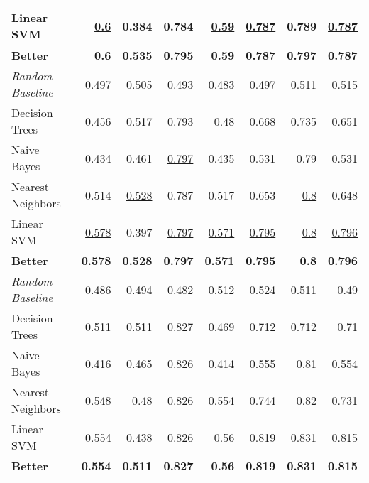 \documentclass[runningheads]{llncs}
\begin{document}
\begin{table*}[t]
\begin{tabular}{lrrrrrrr}
		Linear SVM               & \underline{0.6}      & 0.384          & 0.784          & \underline{0.59}     & \underline{0.787}    & 0.789          & \underline{0.787}    \\    \midrule
		\textbf{Better}          & \textbf{0.6}   & \textbf{0.535} & \textbf{0.795} & \textbf{0.59}  & \textbf{0.787} & \textbf{0.797} & \textbf{0.787} \\    \bottomrule
		\textit{Random Baseline} & 0.497          & 0.505          & 0.493          & 0.483          & 0.497          & 0.511          & 0.515          \\
		Decision Trees           & 0.456          & 0.517          & 0.793          & 0.48           & 0.668          & 0.735          & 0.651          \\
		Naive Bayes              & 0.434          & 0.461          & \underline{0.797}    & 0.435          & 0.531          & 0.79           & 0.531          \\
		Nearest Neighbors        & 0.514          & \underline{0.528}    & 0.787          & 0.517          & 0.653          & \underline{0.8}      & 0.648          \\
		Linear SVM               & \underline{0.578}    & 0.397          & \underline{0.797}    & \underline{0.571}    & \underline{0.795}    & \underline{0.8}      & \underline{0.796}    \\    \midrule
		\textbf{Better}          & \textbf{0.578} & \textbf{0.528} & \textbf{0.797} & \textbf{0.571} & \textbf{0.795} & \textbf{0.8}   & \textbf{0.796} \\    \bottomrule
		\textit{Random Baseline} & 0.486          & 0.494          & 0.482          & 0.512          & 0.524          & 0.511          & 0.49           \\
		Decision Trees           & 0.511          & \underline{0.511}    & \underline{0.827}    & 0.469          & 0.712          & 0.712          & 0.71           \\
		Naive Bayes              & 0.416          & 0.465          & 0.826          & 0.414          & 0.555          & 0.81           & 0.554          \\
		Nearest Neighbors        & 0.548          & 0.48           & 0.826          & 0.554          & 0.744          & 0.82           & 0.731          \\
		Linear SVM               & \underline{0.554}    & 0.438          & 0.826          & \underline{0.56}     & \underline{0.819}    & \underline{0.831}    & \underline{0.815}    \\    \midrule
		\textbf{Better}          & \textbf{0.554} & \textbf{0.511} & \textbf{0.827} & \textbf{0.56}  & \textbf{0.819} & \textbf{0.831} & \textbf{0.815}	\\    \bottomrule
	\end{tabular}
\end{table*}
\end{document}
